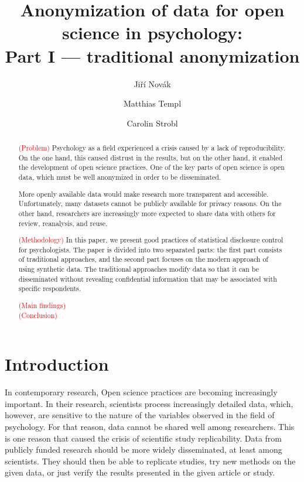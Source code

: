 \documentclass{article}
\title{Anonymization of data for open science in psychology: \\ 
       Part I — traditional anonymization
}
\author{Jiří Novák \and 
        Matthias Templ \and 
        Carolin Strobl
        }
\begin{document}
\maketitle

\begin{abstract}
\textcolor{red}{(Problem)} Psychology as a field experienced a crisis caused by a lack of reproducibility. On the one hand, this caused distrust in the results, but on the other hand, it enabled the development of open science practices. One of the key parts of open science is open data, which must be well anonymized in order to be disseminated. 

More openly available data would make research more transparent and accessible. Unfortunately, many datasets cannot be publicly available for privacy reasons. On the other hand, researchers are increasingly more expected to share data with others for review, reanalysis, and reuse.

\textcolor{red}{(Methodology)} In this paper, we present good practices of statistical disclosure control for psychologists. The paper is divided into two separated parts: the first part consists of traditional approaches, and the second part focuses on the modern approach of using synthetic data.
The traditional approaches modify data so that it can be disseminated without revealing confidential information that may be associated with specific respondents. 

\textcolor{red}{(Main findings)} \\ 

\textcolor{red}{(Conclusion)} \\ 

\end{abstract}


\section{Introduction}

In contemporary research, Open science practices are becoming increasingly important. In their research, scientists process increasingly detailed data, which, however, are sensitive to the nature of the variables observed in the field of psychology.
For that reason, data cannot be shared well among researchers. This is one reason that caused the crisis of scientific study replicability. Data from publicly funded research should be more widely disseminated, at least among scientists. They should then be able to replicate studies, try new methods on the given data, or just verify the results presented in the given article or study.
\newline
\end{document}
